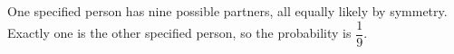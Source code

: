 One specified person has nine possible partners, all equally likely by symmetry. Exactly one is the other specified person, so the probability is $\boxed{\dfrac{1}{9}}$.
